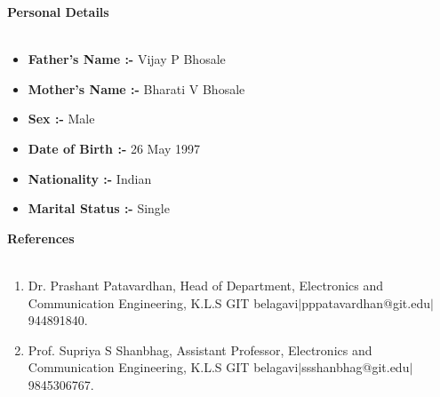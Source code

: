 \documentclass[15pt]{article}
\begin{document}
\vspace{1mm}
\begin{flushleft}
	{\textbf{Personal Details}} \\
	\vspace{0.5mm}
	\noindent \hrulefill 
	\vspace{0.5mm} \\
	\begin{itemize}
		\item \textbf{Father's Name :-} Vijay P Bhosale
		\item \textbf{Mother's Name :-} Bharati V Bhosale
		\item \textbf{Sex :-} Male
		\item \textbf{Date of Birth :-} 26 May 1997
		\item \textbf{Nationality :-} Indian
		\item \textbf{Marital Status :-} Single
	\end{itemize}
\end{flushleft}
\vspace{1mm}
\begin{flushleft}
	{\textbf{References}} \\
	\vspace{0.5mm}
	\noindent \hrulefill 
	\vspace{0.5mm} \\
	\begin{enumerate}
		\item Dr. Prashant Patavardhan, Head of Department, Electronics and Communication Engineering, K.L.S GIT belagavi$|$pppatavardhan@git.edu$|$944891840.
		\item Prof. Supriya S Shanbhag, Assistant Professor, Electronics and Communication Engineering, K.L.S GIT belagavi$|$ssshanbhag@git.edu$|$9845306767.
	\end{enumerate}
\end{flushleft}
\end{document}

